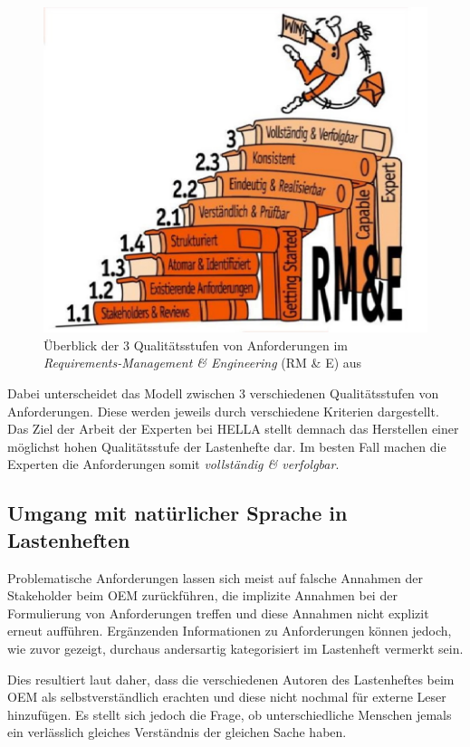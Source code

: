\documentclass[12pt]{report}
\begin{document}
\begin{figure}[h!]
\begin{center}
\includegraphics[scale=0.5]{Bilder/HOOD-RE.jpg}
\caption{Überblick der 3 Qualitätsstufen von Anforderungen im \textit{Requirements-Management \& Engineering} (RM \& E) aus \cite{hp12}}
\end{center}
\end{figure}

Dabei unterscheidet das Modell zwischen 3 verschiedenen Qualitätsstufen von Anforderungen. Diese werden jeweils durch verschiedene Kriterien dargestellt. Das Ziel der Arbeit der Experten bei HELLA stellt demnach das Herstellen einer möglichst hohen Qualitätsstufe der Lastenhefte dar. Im besten Fall machen die Experten die Anforderungen somit \textit{vollständig \& verfolgbar}.

\subsection{Umgang mit natürlicher Sprache in Lastenheften}
Problematische Anforderungen lassen sich meist auf falsche Annahmen der Stakeholder beim OEM zurückführen, die implizite Annahmen bei der Formulierung von Anforderungen treffen und diese Annahmen nicht explizit erneut aufführen. Ergänzenden Informationen zu Anforderungen können jedoch, wie zuvor gezeigt, durchaus andersartig kategorisiert im Lastenheft vermerkt sein. 

Dies resultiert laut \cite{pr15} daher, dass die verschiedenen Autoren des Lastenheftes beim OEM als selbstverständlich erachten und diese nicht nochmal für externe Leser hinzufügen. Es stellt sich jedoch die Frage, ob unterschiedliche Menschen jemals ein verlässlich gleiches Verständnis der gleichen Sache haben. 
\end{document}
